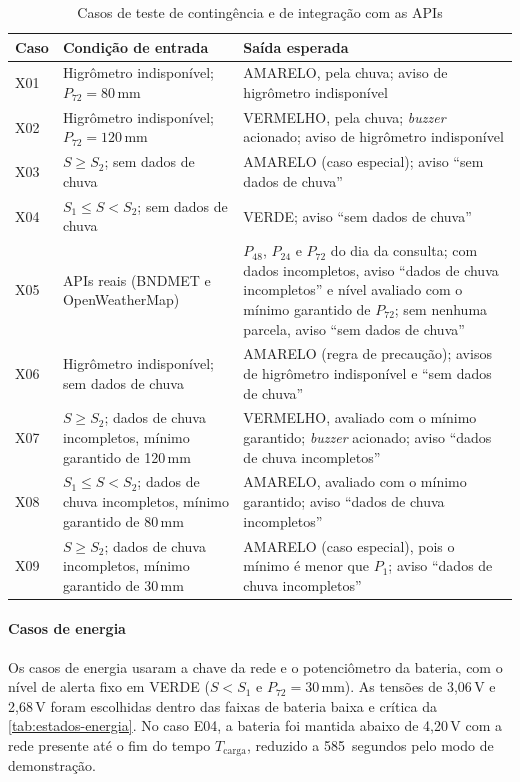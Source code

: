 \begin{table}[H]
\centering
\caption{Casos de teste de contingência e de integração com as APIs}
\label{tab:casos-contingencia}
\small
\begin{tabular}{p{0.8cm}p{6.3cm}p{7.6cm}}
\hline
\textbf{Caso} & \textbf{Condição de entrada} & \textbf{Saída esperada} \\
\hline
X01 & Higrômetro indisponível; $P_{72} = 80$\,mm & AMARELO, pela chuva; aviso de higrômetro indisponível \\
X02 & Higrômetro indisponível; $P_{72} = 120$\,mm & VERMELHO, pela chuva; \textit{buzzer} acionado; aviso de higrômetro indisponível \\
X03 & $S \geq S_2$; sem dados de chuva & AMARELO (caso especial); aviso ``sem dados de chuva'' \\
X04 & $S_1 \leq S < S_2$; sem dados de chuva & VERDE; aviso ``sem dados de chuva'' \\
X05 & APIs reais (BNDMET e OpenWeatherMap) & $P_{48}$, $P_{24}$ e $P_{72}$ do dia da consulta; com dados incompletos, aviso ``dados de chuva incompletos'' e nível avaliado com o mínimo garantido de $P_{72}$; sem nenhuma parcela, aviso ``sem dados de chuva'' \\
X06 & Higrômetro indisponível; sem dados de chuva & AMARELO (regra de precaução); avisos de higrômetro indisponível e ``sem dados de chuva'' \\
X07 & $S \geq S_2$; dados de chuva incompletos, mínimo garantido de 120\,mm & VERMELHO, avaliado com o mínimo garantido; \textit{buzzer} acionado; aviso ``dados de chuva incompletos'' \\
X08 & $S_1 \leq S < S_2$; dados de chuva incompletos, mínimo garantido de 80\,mm & AMARELO, avaliado com o mínimo garantido; aviso ``dados de chuva incompletos'' \\
X09 & $S \geq S_2$; dados de chuva incompletos, mínimo garantido de 30\,mm & AMARELO (caso especial), pois o mínimo é menor que $P_1$; aviso ``dados de chuva incompletos'' \\
\hline
\end{tabular}
\end{table}

\paragraph*{Casos de energia}

Os casos de energia usaram a chave da rede e o potenciômetro da bateria,
com o nível de alerta fixo em VERDE ($S < S_1$ e $P_{72} = 30$\,mm). As
tensões de 3,06\,V e 2,68\,V foram escolhidas dentro das faixas de bateria
baixa e crítica da \autoref{tab:estados-energia}.
No caso E04, a bateria foi mantida abaixo de 4,20\,V com a rede presente
até o fim do tempo $T_{\mathrm{carga}}$, reduzido a 585~segundos pelo modo
de demonstração.


